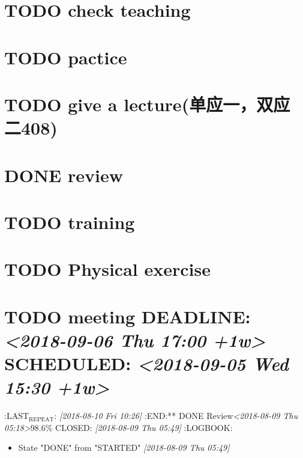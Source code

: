 \documentclass[cyan]{elegantnote}
\begin{document}
\chapter{{\bfseries\sffamily TODO} check teaching}
\label{sec:orgf53edf6}
\chapter{{\bfseries\sffamily TODO} pactice}
\label{sec:org5d4efb5}
\chapter{{\bfseries\sffamily TODO} give a lecture(单应一，双应二408)}
\label{sec:org1a35a0e}
\chapter{{\bfseries\sffamily DONE} review}
\label{sec:orgc5a0096}
\chapter{{\bfseries\sffamily TODO} training}
\label{sec:orgdfa993a}
\chapter{{\bfseries\sffamily TODO} Physical exercise}
\label{sec:orgbc96a24}
\chapter{{\bfseries\sffamily TODO} meeting  DEADLINE: \textit{<2018-09-06 Thu 17:00 +1w> } SCHEDULED: \textit{<2018-09-05 Wed 15:30 +1w>}}
\label{sec:org76e13af}
:LAST\(_{\text{REPEAT}}\): \textit{[2018-08-10 Fri 10:26]}
:END:** DONE Review\textit{<2018-08-09 Thu 05:18>}98.6\%
 CLOSED: \textit{[2018-08-09 Thu 05:49]}
 :LOGBOOK:
\begin{itemize}
\item State "DONE"       from "STARTED"    \textit{[2018-08-09 Thu 05:49]}
\end{itemize}
\end{document}
